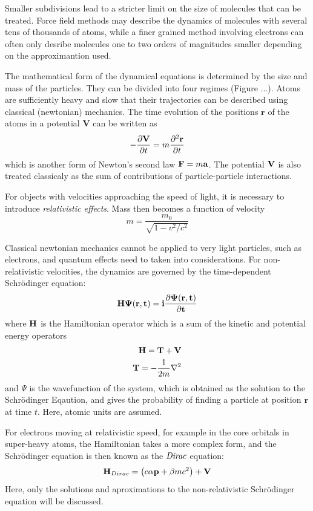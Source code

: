 Smaller subdivisions lead to a stricter limit on the size of molecules that can be treated. Force field methods may describe the dynamics of molecules with several tens of thousands of atoms, while a finer grained method involving electrons can often only desribe molecules one to two orders of magnitudes smaller depending on the approximantion used.

The mathematical form of the dynamical equations is determined by the size and mass of the particles. They can be divided into four regimes (Figure ...). Atoms are sufficiently heavy and slow that their trajectories can be described using classical (newtonian) mechanics. The time evolution of the positions $\mathbf{r}$ of the atoms in a potential $\mathbf{V}$ can be written as
\begin{equation}
-\frac{\partial \mathbf{V}}{\partial t} = m\frac{\partial^2 \mathbf{r}}{\partial t}
\end{equation} 
\noindent which is another form of Newton's second law $\mathbf{F} = m\mathbf{a}$. The potential $\mathbf{V}$ is also treated classicaly as the sum of contributions of particle-particle interactions.

For objects with velocities approaching the speed of light, it is necessary to introduce \emph{relativistic effects}. Mass then becomes a function of velocity
\begin{equation}
m = \frac{m_0}{\sqrt{1-v^2/c^2}}
\end{equation}

Classical newtonian mechanics cannot be applied to very light particles, such as electrons, and quantum effects need to taken into considerations. For non-relativistic velocities, the dynamics are governed by the time-dependent Schrödinger equation:
\begin{equation}
\mathbf{\mathbf{H} \Psi(\mathbf{r},t) = i \frac{\partial \Psi(\mathbf{r},t)}{\partial t}}
\end{equation}
\noindent where $\mathbf{H}$ is the Hamiltonian operator which is a sum of the kinetic and potential energy operators
\begin{align}
\mathbf{H} = \mathbf{T} + \mathbf{V} \\
\mathbf{T} = -\frac{1}{2m} \nabla^2
\end{align}
\noindent and $\Psi$ is the wavefunction of the system, which is obtained as the solution to the Schrödinger Eqaution, and gives the probability of finding a particle at position $\mathbf{r}$ at time $t$. Here, atomic units are assumed.

For electrons moving at relativistic speed, for example in the core orbitals in super-heavy atoms, the Hamiltonian takes a more complex form, and the Schrödinger equation is then known as the $\emph{Dirac}$ equation:
\begin{equation}
\mathbf{H}_{Dirac} = \left(c\mathbf{\alpha} \mathbf{p} + \mathbf{\beta}mc^2\right) + \mathbf{V}
\end{equation}
Here, only the solutions and aproximations to the non-relativistic Schrödinger equation will be discussed.

